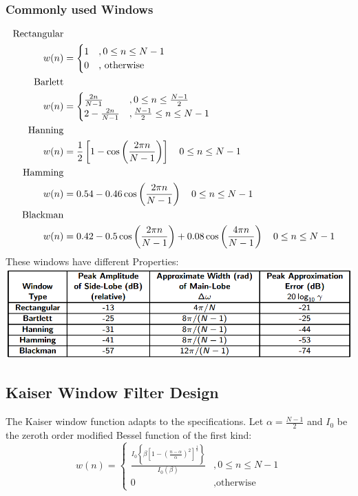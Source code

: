 \documentclass[accentcolor=tud4c,9.5pt,nochapname,bigchapter,paper=a5report]{tudreport}
\begin{document}
\subsubsection{Commonly used Windows}
\begin{subequations}
\begin{align}
\text{Rectangular} \notag \\
w(n) &= \begin{cases}
1 &,0\leq n \leq N-1\\
0		&\text{, otherwise}
\end{cases}\\
\text{Barlett} \notag \\
w(n) &= \begin{cases}
\frac{2n}{N-1} &,0\leq n \leq \frac{N-1}{2}\\
2-\frac{2n}{N-1}		&,\frac{N-1}{2}\leq n\leq N-1
\end{cases}\\
\text{Hanning} \notag \\
w(n)& = \frac{1}{2}\left[1-\cos\left(\frac{2\pi n}{N-1}\right)\right] \quad 0\leq n \leq N-1\\
\text{Hamming} \notag \\
w(n)& = 0.54-0.46\cos\left(\frac{2\pi n}{N-1}\right) \quad 0\leq n \leq N-1 \\
\text{Blackman} \notag \\
w(n)& = 0.42-0.5\cos\left(\frac{2\pi n}{N-1}\right)+0.08\cos\left(\frac{4\pi n}{N-1}\right) \quad 0\leq n \leq N-1
\end{align}
\end{subequations}
These windows have different Properties: \\
\includegraphics[width=\textwidth]{images/window_props.png}


\subsection{Kaiser Window Filter Design}
The Kaiser window function adapts to the specifications. Let $\alpha = \frac{N-1}{2}$ and $I_0$ be the zeroth
order modified Bessel function of the first kind:
\begin{equation}
w(n)=\begin{cases}
\frac{I_0\left\{\beta\left[1-\left(\frac{n-\alpha}{\alpha}\right)^2\right]^{\frac{1}{2}}\right\}}{I_0(\beta)} &,0\leq n\leq N-1\\
0 &,\text{otherwise}
\end{cases}
\end{equation}
\end{document}
